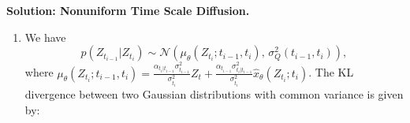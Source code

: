\documentclass[12pt]{article}
\begin{document}
\begin{enumerate}
\begin{solution}{\bf Solution: Nonuniform Time Scale Diffusion.}
\begin{enumerate}
\[    \]
    and
    \[
    q(\mathbf{Z}|X) = q(Z_{t_0}, \dots, Z_{t_T}|X) = q(Z_0|X) \prod_{i=1}^{T} q(Z_{t_i}|Z_{t_{i-1}},X).
    \]
    By Bayes' theorem,
    \[q(Z_{t_i}|Z_{t_{i-1}},X)=q(Z_{t_i}|Z_{t_{i-1}})=\frac{q(Z_{t_{i-1}}|Z_{t_i},X)q(Z_{t_i}|X)}{q(Z_{t_{i-1}}|X)}.\]
    Then,
    \[\begin{aligned}
    &\mathbb{E}_{q(\mathbf{Z}|X)}\left[\log\frac{q(\mathbf{Z}|X)}{p(X,\mathbf{Z})}\right] \\
    &= \mathbb{E}_{q(\mathbf{Z}|X)}\left[\log\frac{q(Z_0|X) \prod_{i=1}^{T} q(Z_{t_i}|Z_{t_{i-1}})}{p(Z_1) p(X|Z_0) \prod_{i=1}^{T} p(Z_{t_{i-1}}|Z_{t_i})}\right] \\
    &= \mathbb{E}_{q(\mathbf{Z}|X)}\left[ \log q(Z_0|X) - \log p(X|Z_0) - \log p(Z_1) \right. \\
    & \qquad \left. + \sum_{i=1}^{T} \left( \log q(Z_{t_i}|Z_{t_{i-1}}) - \log p(Z_{t_{i-1}}|Z_{t_i}) \right) \right] \\
    &= \mathbb{E}_{q(\mathbf{Z}|X)}\left[ \log q(Z_0|X) - \log p(X|Z_0) - \log p(Z_1) \right. \\
    & \qquad \left. + \sum_{i=1}^{T} \left( \log\frac{q(Z_{t_{i-1}}|Z_{t_i}, X)q(Z_{t_i}|X)}{q(Z_{t_{i-1}}|X)} - \log p(Z_{t_{i-1}}|Z_{t_i}) \right) \right] \\
    &= \mathbb{E}_{q(\mathbf{Z}|X)}\left[ \log q(Z_0|X) - \log p(X|Z_0) - \log p(Z_1) \right. \\
    & \qquad \left. + \sum_{i=1}^{T} \left( \log q(Z_{t_i}|X) - \log q(Z_{t_{i-1}}|X) \right) + \sum_{i=1}^{T} \log\frac{q(Z_{t_{i-1}}|Z_{t_i}, X)}{p(Z_{t_{i-1}}|Z_{t_i})} \right] \\
    &= \mathbb{E}_{q(\mathbf{Z}|X)}\left[ \log q(Z_0|X) - \log p(X|Z_0) - \log p(Z_1) \right. \\
    & \qquad \left. + (\log q(Z_1|X) - \log q(Z_0|X)) + \sum_{i=1}^{T} \log\frac{q(Z_{t_{i-1}}|Z_{t_i}, X)}{p(Z_{t_{i-1}}|Z_{t_i})} \right] \\
    &=\mathbb{E}_{q(Z_0|X)}[-\log p(X|Z_0)] + D(q(Z_1|X) \| p(Z_1)) + \mathcal{L}(X).
    \end{aligned}\]
    \item We have \[p(Z_{t_{i-1}}|Z_{t_i})\sim \mathcal{N}(\mu_{\theta}(Z_{t_i};t_{i-1},t_i),\,\sigma_Q^2(t_{i-1},t_i)),\] where $\mu_{\theta}(Z_{t_i};t_{i-1},t_i) = \frac{\alpha_{t_i|t_{i-1}}\sigma_{t_{i-1}}^2}{\sigma_{t_i}^2}Z_t+\frac{\alpha_{t_{i-1}}\sigma_{t_i|t_{i-1}}^2}{\sigma_{t_i}^2}\hat{x}_{\theta}(Z_{t_i};t_i)$.
    The KL divergence between two Gaussian distributions with common variance is given by:

\end{enumerate}
\end{solution}
\end{enumerate}
\end{document}
